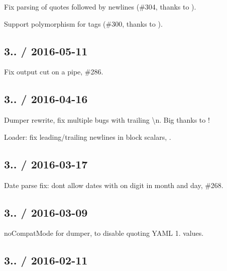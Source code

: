 
\begin{DoxyItemize}
\item Fix parsing of quotes followed by newlines (\#304, thanks to ).
\item Support polymorphism for tags (\#300, thanks to ).
\end{DoxyItemize}

\subsection*{3.. / 2016-\/05-\/11 }


\begin{DoxyItemize}
\item Fix output cut on a pipe, \#286.
\end{DoxyItemize}

\subsection*{3.. / 2016-\/04-\/16 }


\begin{DoxyItemize}
\item Dumper rewrite, fix multiple bugs with trailing {\ttfamily \textbackslash{}n}. Big thanks to !
\item Loader\+: fix leading/trailing newlines in block scalars, .
\end{DoxyItemize}

\subsection*{3.. / 2016-\/03-\/17 }


\begin{DoxyItemize}
\item Date parse fix\+: don\textquotesingle{}t allow dates with on digit in month and day, \#268.
\end{DoxyItemize}

\subsection*{3.. / 2016-\/03-\/09 }


\begin{DoxyItemize}
\item {\ttfamily no\+Compat\+Mode} for dumper, to disable quoting Y\+A\+ML 1. values.
\end{DoxyItemize}

\subsection*{3.. / 2016-\/02-\/11 }


